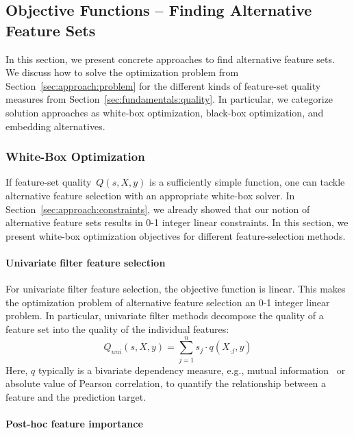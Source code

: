 \documentclass{article}
\theoremstyle{definition}
\begin{document}
\subsection{Objective Functions -- Finding Alternative Feature Sets}
\label{sec:approach:objectives}

In this section, we present concrete approaches to find alternative feature sets.
We discuss how to solve the optimization problem from Section~\ref{sec:approach:problem} for the different kinds of feature-set quality measures from Section~\ref{sec:fundamentals:quality}.
In particular, we categorize solution approaches as white-box optimization, black-box optimization, and embedding alternatives.

\subsubsection{White-Box Optimization}
\label{sec:approach:objectives:white-box}

If feature-set quality~$Q(s,X,y)$ is a sufficiently simple function, one can tackle alternative feature selection with an appropriate white-box solver.
In Section~\ref{sec:approach:constraints}, we already showed that our notion of alternative feature sets results in 0-1 integer linear constraints.
In this section, we present white-box optimization objectives for different feature-selection methods.

\paragraph{Univariate filter feature selection}

For univariate filter feature selection, the objective function is linear.
This makes the optimization problem of alternative feature selection an 0-1 integer linear problem.
In particular, univariate filter methods decompose the quality of a feature set into the quality of the individual features:
%
\begin{equation}
	Q_{uni}(s,X,y) = \sum_{j=1}^{n} s_j  \cdot q(X_{\cdot{}j},y)
	\label{eq:univariate-filter}
\end{equation}
%
Here, $q$ typically is a bivariate dependency measure, e.g., mutual information~\cite{kraskov2004estimating} or absolute value of Pearson correlation, to quantify the relationship between a feature and the prediction target.

\paragraph{Post-hoc feature importance}
\end{document}
